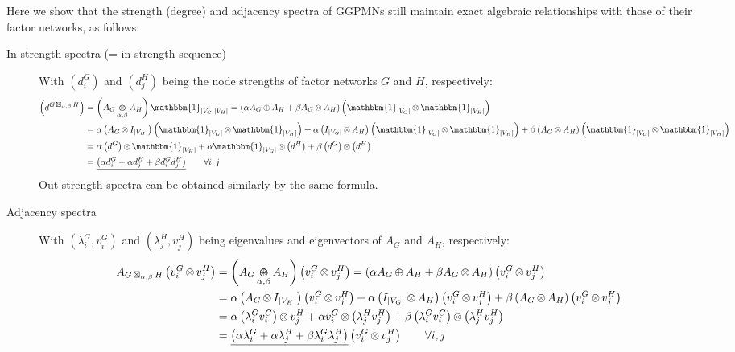 \documentclass{article}
\DeclareMathOperator*{\KS}{\oplus}
\DeclareMathOperator*{\KP}{\otimes}
\DeclareMathOperator*{\GP}{\boxtimes}
\DeclareMathOperator*{\KG}{\mathrlap{\oplus}\otimes}
\newcommand{\bone}{\mathbbm{1}}
\begin{document}
Here we show that the strength (degree) and adjacency spectra of
GGPMNs still maintain exact algebraic relationships with those of
their factor networks, as follows:
\begin{description}
\item[In-strength spectra (= in-strength sequence)] With $\left( d^G_i \right)$ and
  $\left( d^H_j \right)$ being the node strengths of factor networks $G$ and $H$,
  respectively:
\begin{align}
\left(d^{G \GP_{\alpha, \beta} H}\right)
&= \left( A_G \KG_{\alpha, \beta} A_H \right) \bone_{|V_G||V_H|} 
= \left( \alpha A_G \KS A_H + \beta A_G \KP A_H \right) \left(\bone_{|V_G|} \KP \bone_{|V_H|} \right)\\
&= \alpha \left( A_G \KP I_{|V_H|} \right) \left(\bone_{|V_G|} \KP \bone_{|V_H|} \right) + \alpha \left( I_{|V_G|} \KP A_H \right) \left(\bone_{|V_G|} \KP \bone_{|V_H|} \right) + \beta \left( A_G \KP A_H \right) \left(\bone_{|V_G|} \KP \bone_{|V_H|} \right)\\
&= \alpha \left( d^G \right) \KP \bone_{|V_H|} + \alpha \bone_{|V_G|} \KP \left( d^H \right) 
+ \beta \left( d^G \right) \KP \left( d^H \right) \\
&= \underline{\left( \alpha d^G_i + \alpha d^H_j + \beta d^G_i d^H_j \right)} \quad \quad \forall i, j
\end{align}
Out-strength spectra can be obtained similarly by the same formula.
\item[Adjacency spectra] With $\left( \lambda^G_i, v^G_i \right)$ and $\left( \lambda^H_j,
v^H_j \right)$ being eigenvalues and eigenvectors of $A_G$ and $A_H$,
respectively:
\begin{align}
A_{G \GP_{\alpha, \beta} H} \left( v^G_i \KP v^H_j \right) &=
\left( A_G \KG_{\alpha, \beta} A_H \right) \left( v^G_i \KP v^H_j \right) = 
\left( \alpha A_G \KS A_H + \beta A_G \KP A_H \right) \left( v^G_i \KP v^H_j \right)\\
&= \alpha \left( A_G \KP I_{|V_H|} \right) \left( v^G_i \KP v^H_j \right) + \alpha \left( I_{|V_G|} \KP A_H \right) \left( v^G_i \KP v^H_j \right) + \beta \left( A_G \KP A_H \right) \left( v^G_i \KP v^H_j \right)\\
&= \alpha \left( \lambda^G_i v^G_i \right) \KP v^H_j + \alpha v^G_i \KP \left( \lambda^H_j v^H_j \right)
+ \beta \left( \lambda^G_i v^G_i \right) \KP \left( \lambda^H_j v^H_j \right)\\
&= \underline{\left( \alpha \lambda^G_i + \alpha \lambda^H_j + \beta \lambda^G_i \lambda^H_j \right)} \left( v^G_i \KP v^H_j \right)
\quad \quad \forall i, j
\end{align}
\end{description}
\end{document}
